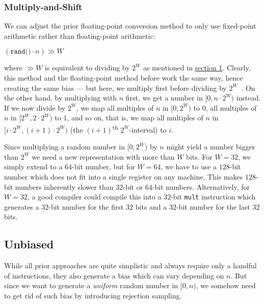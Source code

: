 \documentclass[a4paper, UKenglish, cleveref, autoref, thm-restate]{lipics-v2021}
\begin{document}
\subsubsection{Multiply-and-Shift}\label{sec:2.1.3}
We can adjust the prior floating-point conversion method to only use fixed-point arithmetic rather than floating-point arithmetic:
\begin{center}
    $\left(\texttt{rand()} \cdot n\right) \gg W$
\end{center}
where $\gg W$ is equivalent to dividing by $2^W$ as mentioned in \hyperref[sec:1.2]{section 1}.
Clearly, this method and the floating-point method before work the same way, hence creating the same bias --- but here, we multiply first before dividing by $2^W$~\cite{MultShift}.
On the other hand, by multiplying with $n$ first, we get a number in $[0,n \cdot 2^W)$ instead.
If we now divide by $2^W$, we map all multiples of $n$ in $[0,2^W)$ to $0$, all multiples of $n$ in $[2^W, 2 \cdot 2^W)$ to $1$, and so on, that is, we map all multiples of $n$ in $[i \cdot 2^W, (i + 1) \cdot 2^W)$ (the $(i + 1)$\textsuperscript{th} $2^W$-interval) to $i$.

Since multiplying a random number in $[0,2^W)$ by $n$ might yield a number bigger than $2^W$ we need a new representation with more than $W$ bits.
For $W = 32$, we simply extend to a $64$-bit number, but for $W = 64$, we have to use a $128$-bit number which does not fit into a single register on any machine. 
This makes $128$-bit numbers inherently slower than $32$-bit or $64$-bit numbers.
Alternatively, for $W = 32$, a good compiler could compile this into a $32$-bit \texttt{mult} instruction which generates a $32$-bit number for the first $32$ bits and a $32$-bit number for the last $32$ bits.


\subsection{Unbiased}
While all prior approaches are quite simplistic and always require only a handful of instructions, they also generate a bias which can vary depending on $n$.
But since we want to generate a \emph{uniform} random number in $[0,n)$, we somehow need to get rid of such bias by introducing rejection sampling.
\end{document}
